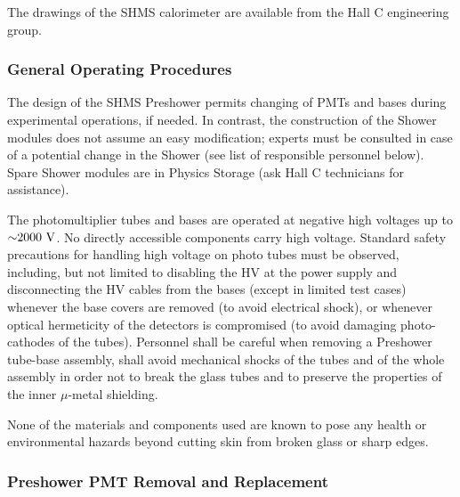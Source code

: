 The drawings of the SHMS calorimeter are available from the Hall C
engineering group.





  
\subsubsection{General Operating Procedures}
The design of the SHMS Preshower permits changing of PMTs and bases during
experimental operations, if needed. In contrast, the construction of the
Shower modules does not assume an easy modification; experts must be
consulted in case of a potential change in the Shower (see list of
responsible personnel below). Spare Shower modules are in Physics
Storage (ask Hall C technicians for assistance).

The photomultiplier tubes and bases are operated at negative high
voltages up to $\mathord{\sim} 2000~\textrm{V}$. No directly accessible
components carry high voltage. Standard safety precautions for
handling high voltage on photo tubes must be observed, including, but
not limited to disabling the HV at the power supply and disconnecting
the HV cables from the bases (except in limited test cases) whenever
the base covers are removed (to avoid electrical shock), or whenever
optical hermeticity of the detectors is compromised (to avoid damaging
photo-cathodes of the tubes). Personnel shall be careful when
removing a Preshower tube-base assembly, shall avoid mechanical shocks
of the tubes and of the whole assembly in order not to break the glass
tubes and to preserve the properties of the inner $\mu$-metal
shielding.

None of the materials and components used are known to pose any health
or environmental hazards beyond cutting skin from broken glass or
sharp edges.

\subsubsection{Preshower PMT Removal and Replacement}
